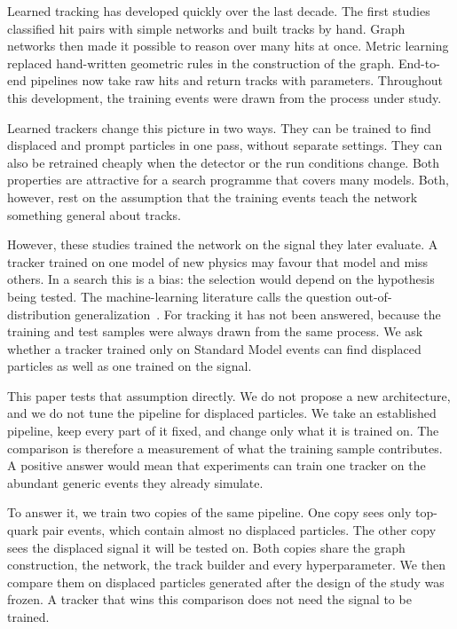 Learned tracking has developed quickly over the last decade.
The first studies classified hit pairs with simple networks and built tracks by hand.
Graph networks then made it possible to reason over many hits at once.
Metric learning replaced hand-written geometric rules in the construction of the graph.
End-to-end pipelines now take raw hits and return tracks with parameters.
Throughout this development, the training events were drawn from the process under study.

Learned trackers change this picture in two ways.
They can be trained to find displaced and prompt particles in one pass, without separate settings.
They can also be retrained cheaply when the detector or the run conditions change.
Both properties are attractive for a search programme that covers many models.
Both, however, rest on the assumption that the training events teach the network something general about tracks.

However, these studies trained the network on the signal they later evaluate.
A tracker trained on one model of new physics may favour that model and miss others.
In a search this is a bias: the selection would depend on the hypothesis being tested.
The machine-learning literature calls the question out-of-distribution generalization~\cite{Tanaka2015Generalization,Abe2020Domain}.
For tracking it has not been answered, because the training and test samples were always drawn from the same process.
We ask whether a tracker trained only on Standard Model events can find displaced particles as well as one trained on the signal.

This paper tests that assumption directly.
We do not propose a new architecture, and we do not tune the pipeline for displaced particles.
We take an established pipeline, keep every part of it fixed, and change only what it is trained on.
The comparison is therefore a measurement of what the training sample contributes.
A positive answer would mean that experiments can train one tracker on the abundant generic events they already simulate.

To answer it, we train two copies of the same pipeline.
One copy sees only top-quark pair events, which contain almost no displaced particles.
The other copy sees the displaced signal it will be tested on.
Both copies share the graph construction, the network, the track builder and every hyperparameter.
We then compare them on displaced particles generated after the design of the study was frozen.
A tracker that wins this comparison does not need the signal to be trained.

